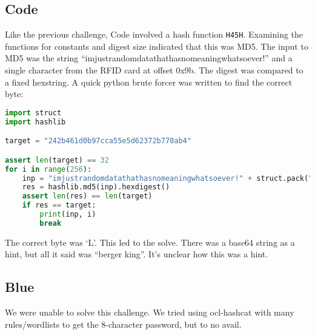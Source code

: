 \subsection{Code}
Like the previous challenge, Code involved a hash function \texttt{H45H}. Examining the functions for constants and digest size indicated that this was MD5. The input to MD5 was the string ``imjustrandomdatathathasnomeaningwhatsoever!'' and a single character from the RFID card at offset 0x9b. The digest was compared to a fixed hexstring. A quick python brute forcer was written to find the correct byte:

\begin{lstlisting}[language=python]
import struct
import hashlib

target = "242b461d0b97cca55e5d62372b770ab4"

assert len(target) == 32
for i in range(256):
    inp = "imjustrandomdatathathasnomeaningwhatsoever!" + struct.pack("B", i)
    res = hashlib.md5(inp).hexdigest()
    assert len(res) == len(target)
    if res == target:
        print(inp, i)
        break
\end{lstlisting}

The correct byte was `L'. This led to the solve.
There was a base64 string as a hint, but all it said was ``berger king''. It's unclear how this was a hint.

\subsection{Blue}
We were unable to solve this challenge. We tried using ocl-hashcat with many rules/wordlists to get the 8-character password, but to no avail.

